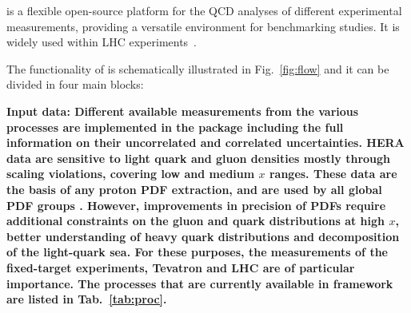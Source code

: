 %
\label{sec:structure}

\fitter is a flexible open-source platform for the QCD analyses of different experimental measurements, 
providing a versatile environment for benchmarking studies. It is widely used within 
LHC experiments~\cite{atlas:strange,atlas:jets,atlas:hm,cms:strange,cms:jets,h1:2012kk,h1zeus:charm}.  

The functionality of \fitter is schematically illustrated in Fig.~\ref{fig:flow} and it can be divided in four main blocks: %

\begin{description}
\item 
\bf {Input data:} \rm Different available measurements from the various processes
are implemented in the \fitter package including the full information on their uncorrelated 
and correlated uncertainties. HERA data 
are sensitive to light quark and gluon densities mostly through scaling violations, 
covering low and medium $x$ ranges. These data are the basis of any proton PDF extraction,
and are used by all global PDF groups \cite{MSTWpdf, CT10pdf, NNPDFpdf, ABMpdf, JRpdf}. 
However, improvements in precision of PDFs require additional constraints on the gluon and 
quark distributions at high $x$, better understanding of heavy quark distributions and 
decomposition of the light-quark sea.  For these purposes, the measurements of the fixed-target 
experiments, Tevatron and LHC are of particular importance.
%
%
The processes that are currently available in \fitter framework are listed in Tab.~\ref{tab:proc}.

%
\begin{table}
\small
\scriptsize


\end{table}
\end{description}
